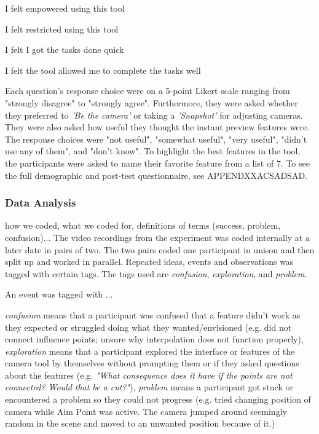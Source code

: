 \setlength{\parindent}{1cm}
I felt empowered using this tool

\setlength{\parskip}{0pt}
I felt restricted using this tool

I felt I got the tasks done quick

I felt the tool allowed me to complete the tasks well

\setlength{\parskip}{15pt}
\setlength{\parindent}{0cm}
Each question's response choice were on a 5-point Likert scale ranging from "strongly disagree" to "strongly agree". Furthermore, they were asked whether they preferred to \textit{'Be the camera'} or taking a \textit{'Snapshot'} for adjusting cameras. They were also asked how useful they thought the instant preview features were. The response choices were "not useful", "somewhat useful", "very useful", "didn't use any of them", and "don't know". To highlight the best features in the tool, the participants were asked to name their favorite feature from a list of 7. To see the full demographic and post-test questionnaire, see APPENDXXACSADSAD. 

\subsubsection{Data Analysis}
how we coded, what we coded for, definitions of terms (success, problem, confusion)...
The video recordings from the experiment was coded internally at a later date in pairs of two. The two pairs coded one participant in unison and then split up and worked in parallel. Repeated ideas, events and observations was tagged with certain tags. The tags used are \textit{confusion}, \textit{exploration}, and \textit{problem}.

An event was tagged with ...


\textit{confusion} means that a participant was confused that a feature didn't work as they expected or struggled doing what they wanted/envisioned (e.g. did not connect influence points; unsure why interpolation does not function properly), 
\textit{exploration} means that a participant explored the interface or features of the camera tool by themselves without prompting them or if they asked questions about the features (e.g. \textit{"What consequence does it have if the points are not connected? Would that be a cut?"}), 
\textit{problem} means a participant got stuck or encountered a problem so they could not progress (e.g. tried changing position of camera while Aim Point was active. The camera jumped around seemingly random in the scene and moved to an unwanted position because of it.)

